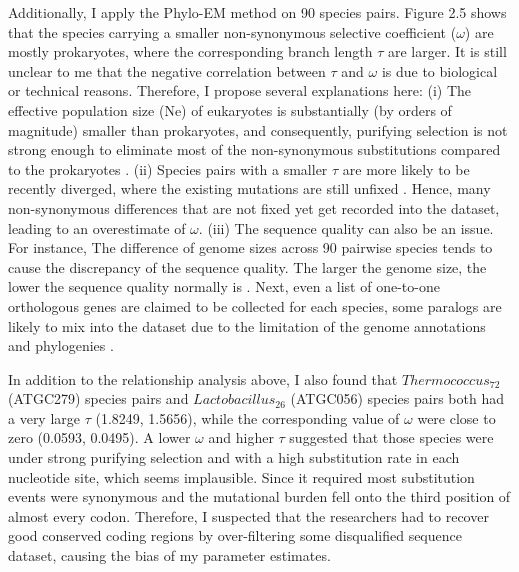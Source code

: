 Additionally, I apply the Phylo-EM method on 90 species pairs. Figure 2.5 shows that the species carrying a smaller non-synonymous selective coefficient ($\omega$) are mostly prokaryotes, where the corresponding branch length $\tau$ are larger. It is still unclear to me that the negative correlation between $\tau$ and $\omega$ is due to biological or technical reasons. Therefore, I propose several explanations here: (i) The effective population size (Ne) of eukaryotes is substantially (by orders of magnitude) smaller than prokaryotes, and consequently, purifying selection is not strong enough to eliminate most of the non-synonymous substitutions compared to the prokaryotes \parencite{sela2016theory}. (ii) Species pairs with a smaller $\tau$ are more likely to be recently diverged, where the existing mutations are still unfixed \parencite{charlesworth2020long}. Hence, many non-synonymous differences that are not fixed yet get recorded into the dataset, leading to an overestimate of $\omega$. (iii) The sequence quality can also be an issue. For instance, The difference of genome sizes across 90 pairwise species tends to cause the discrepancy of the sequence quality. The larger the genome size, the lower the sequence quality normally is \parencite{baker2012novo}. Next, even a list of one-to-one orthologous genes are claimed to be collected for each species, some paralogs are likely to mix into the dataset due to the limitation of the genome annotations and phylogenies \parencite{smith2021new}.  

In addition to the relationship analysis above, I also found that $Thermococcus_{72}$ (ATGC279) species pairs and $Lactobacillus_{26}$ (ATGC056) species pairs both had a very large $\tau$ (1.8249, 1.5656), while the corresponding value of $\omega$ were close to zero (0.0593, 0.0495). A lower $\omega$ and higher $\tau$ suggested that those species were under strong purifying selection and with a high substitution rate in each nucleotide site, which seems implausible. Since it required most substitution events were synonymous and the mutational burden fell onto the third position of almost every codon. Therefore, I suspected that the researchers had to recover good conserved coding regions by over-filtering some disqualified sequence dataset, causing the bias of my parameter estimates. 


